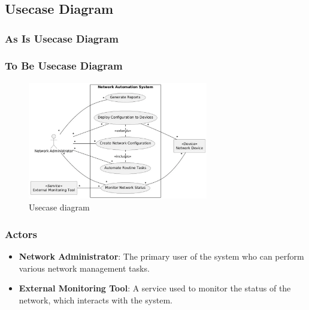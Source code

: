 \chapter{\babEnam}

\section{Usecase Diagram}

\subsection{As Is Usecase Diagram}

\subsection{To Be Usecase Diagram}

\begin{figure}
	\centering
	\includegraphics[width=0.70\textwidth]
		{assets/pics/usecase_diagram.png}
	\caption{Usecase diagram}
	\label{fig:usecase_diagram_ucp}
\end{figure}


\subsection{Actors}
\begin{itemize}
    \item \textbf{Network Administrator}: The primary user of the system who can perform various network management tasks.
    \item \textbf{External Monitoring Tool}: A service used to monitor the status of the network, which interacts with the system.
\end{itemize}

